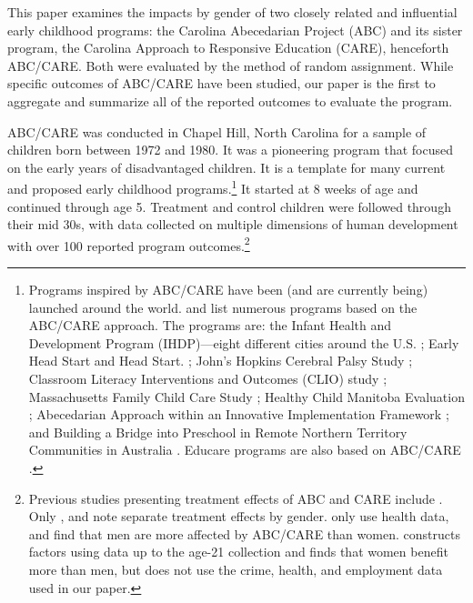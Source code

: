 This paper examines the impacts by gender of two closely related and influential early childhood programs: the Carolina Abecedarian Project (ABC) and its sister program, the Carolina Approach to Responsive Education (CARE), henceforth ABC/CARE. Both were evaluated by the method of random assignment. While specific outcomes of ABC/CARE have been studied, our paper is the first to aggregate and summarize all of the reported outcomes to evaluate the program.

ABC/CARE was conducted in Chapel Hill, North Carolina for a sample of children born between 1972 and 1980. It was a pioneering program that focused on the early years of disadvantaged children. It is a template for many current and proposed early childhood programs.\footnote{Programs inspired by ABC/CARE have been (and are currently being) launched around the world. \citet{Sparling_2010_Highlights} and \citet{Ramey_Ramey_Lanzi_2014_Interventions} list numerous programs based on the ABC/CARE approach. The programs are: the Infant Health and Development Program (IHDP)---eight different cities around the U.S. \citep{Spiker-etal_1997_Helping}; Early Head Start and Head Start. \citep{Schneider_McDonald-eds_2007_Scale-Up_Vol-1}; John's Hopkins Cerebral Palsy Study \citep{Sparling_2010_Highlights}; Classroom Literacy Interventions and Outcomes (CLIO) study \citep{Sparling_2010_Highlights}; Massachusetts Family Child Care Study \citep{Collins_etal_2010_Massachusetts-Study}; Healthy Child Manitoba Evaluation \citep{Healthy_Child_Manitoba_2015_Starting-Early}; Abecedarian Approach within an Innovative Implementation Framework \citep{Jensen_Nielsen_2016_ABC-Programme-Pilot}; and Building a Bridge into Preschool in Remote Northern Territory Communities in Australia \citep{UMonash_Dataset_2015_URL}. Educare programs are also based on ABC/CARE \citep{Educare_2014_Research_Agenda,Yazejian_Bryant_2012_Educare}.} It started at 8 weeks of age and continued through age 5. Treatment and control children were followed through their mid 30s, with data collected on multiple dimensions of human development with over 100 reported program outcomes.\footnote{Previous studies presenting treatment effects of ABC and CARE include \citet{Ramey_etal_1985_Project-CARE_TiECSE,Clarke_Campbell_1998_ABC_Comparison_ECRQ,Campbell_Pungello_etal_2001_DP,Campbell_Ramey_etal_2002_ADS,Anderson_2008_JASA,Campbell_Wasik_etal_2008_ECRQ,Campbell_Conti_etal_2014_EarlyChildhoodInvestments}. Only \citet{Heckman_2006_Science}, \citet{Anderson_2008_JASA} and \citet{Campbell_Conti_etal_2014_EarlyChildhoodInvestments} note separate treatment effects by gender. \citet{Campbell_Conti_etal_2014_EarlyChildhoodInvestments} only use health data, and find that men are more affected by ABC/CARE than women. \citet{Anderson_2008_JASA} constructs factors using data up to the age-21 collection and finds that women benefit more than men, but does not use the crime, health, and employment data used in our paper.}

